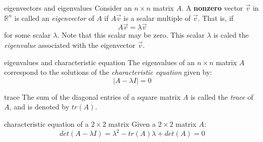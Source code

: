 \documentclass[avery5371,grid,letterpaper]{flashcards}
\newcommand{\Rn}{\mathbb{R}^{n}}
\newcommand{\nbyn}{n\!\times\!n}
\begin{document}
\begin{flashcard}[Definition]{eigenvectors and eigenvalues}
Consider an $\nbyn$ matrix $A$.  A \textbf{nonzero} vector $\vec{v}$ in $\Rn$ is called an \textit{eigenvector} of $A$ if $A\vec{v}$ is a scalar multiple of $\vec{v}$.  That is, if
\begin{displaymath}
A\vec{v} = \lambda\vec{v}
\end{displaymath}
for some scalar $\lambda$.  Note that this scalar may be zero.  This scalar $\lambda$ is caled the \textit{eigenvalue} associated with the eigenvector $\vec{v}$.
\end{flashcard}

\begin{flashcard}[Theorem]{eigenvalues and characteristic equation}
The eigenvalues of an $\nbyn$ matrix $A$ correspond to the solutions of the \textit{characteristic equation} given by:
\begin{displaymath}
\vert A - \lambda I \vert = 0
\end{displaymath}
\end{flashcard}

\begin{flashcard}[Definition]{trace}
The sum of the diagonal entries of a square matrix $A$ is called the \textit{trace} of $A$, and is denoted by $tr(A)$.
\end{flashcard}

\begin{flashcard}[Theorem]{characteristic equation of a $2\!\times\!2$ matrix}
Given a $2\!\times\!2$ matrix $A$:
\begin{displaymath}
det(A - \lambda I) = \lambda^2 - tr(A)\lambda + det(A) = 0
\end{displaymath}
\end{flashcard}
\end{document}
